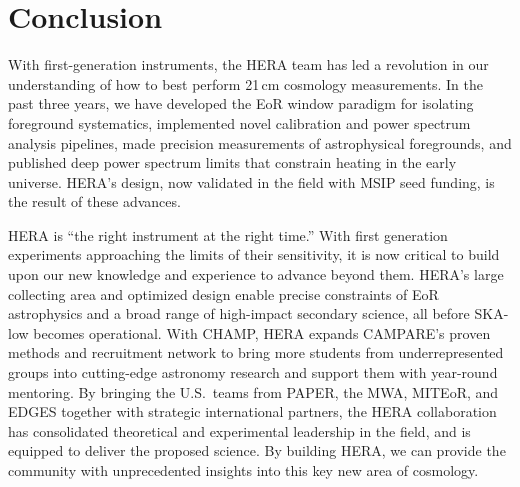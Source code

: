 \documentclass[preprint,11pt]{aastex}
\begin{document}
\section{Conclusion}
\label{sec:conclusion}

\noindent With first-generation instruments, the HERA team has led a revolution in our understanding of how to best perform 21\,cm cosmology measurements.
In the past three years, we have developed the EoR window paradigm for isolating foreground systematics, implemented novel
calibration and power spectrum analysis pipelines, made precision measurements of astrophysical foregrounds, and published deep power 
spectrum limits that constrain heating in the early universe.  HERA's design, now validated in the field with MSIP seed funding, 
is the result of these advances.


HERA is ``the right instrument at the right time.'' With first generation experiments approaching the limits of their sensitivity, it is now critical to build upon our new knowledge and experience to advance beyond them. HERA's large collecting area and optimized design enable precise constraints of EoR astrophysics and a broad range of high-impact secondary science, all before SKA-low becomes operational.
With CHAMP, HERA expands CAMPARE's proven methods and recruitment network to bring more students from underrepresented groups into cutting-edge astronomy research and support them with year-round mentoring.
By bringing the U.S.\ teams from PAPER, the MWA, MITEoR, and EDGES together with strategic international partners,
the HERA collaboration has consolidated theoretical and experimental leadership in the field, 
and is equipped to deliver the proposed science. By building HERA, we can provide the community with unprecedented insights into this key new area of cosmology.


\clearpage
\setcounter{page}{1}
\thispagestyle{empty}
%
%
\nocite{Beardsley:thesis}
\nocite{kolopanis_et_al2016}

%
{\small }
\end{document}
